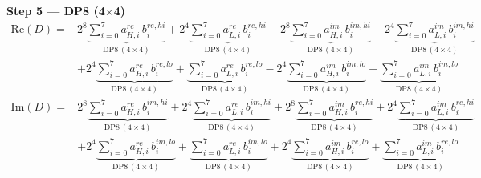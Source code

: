 \documentclass[fleqn]{article}
\newcommand{\DPop}[3]{\mathrm{DP#1}\,(#2\!\times\!#3)}
\begin{document}
\textbf{Step 5 --- DP8 (4$\times$4)}
\begin{align*}
\mathrm{Re}(D) = {}
  & 2^{8}\underbrace{\sum_{i=0}^{7} a_{H,i}^{re}\, b_i^{re,hi}}_{\DPop{8}{4}{4}}
  + 2^{4}\underbrace{\sum_{i=0}^{7} a_{L,i}^{re}\, b_i^{re,hi}}_{\DPop{8}{4}{4}}
  - 2^{8}\underbrace{\sum_{i=0}^{7} a_{H,i}^{im}\, b_i^{im,hi}}_{\DPop{8}{4}{4}}
  - 2^{4}\underbrace{\sum_{i=0}^{7} a_{L,i}^{im}\, b_i^{im,hi}}_{\DPop{8}{4}{4}} \\[0.2em]
  & + 2^{4}\underbrace{\sum_{i=0}^{7} a_{H,i}^{re}\, b_i^{re,lo}}_{\DPop{8}{4}{4}}
  + \underbrace{\sum_{i=0}^{7} a_{L,i}^{re}\, b_i^{re,lo}}_{\DPop{8}{4}{4}}
  - 2^{4}\underbrace{\sum_{i=0}^{7} a_{H,i}^{im}\, b_i^{im,lo}}_{\DPop{8}{4}{4}}
  - \underbrace{\sum_{i=0}^{7} a_{L,i}^{im}\, b_i^{im,lo}}_{\DPop{8}{4}{4}}
\end{align*}
\begin{align*}
\mathrm{Im}(D) = {}
  & 2^{8}\underbrace{\sum_{i=0}^{7} a_{H,i}^{re}\, b_i^{im,hi}}_{\DPop{8}{4}{4}}
  + 2^{4}\underbrace{\sum_{i=0}^{7} a_{L,i}^{re}\, b_i^{im,hi}}_{\DPop{8}{4}{4}}
  + 2^{8}\underbrace{\sum_{i=0}^{7} a_{H,i}^{im}\, b_i^{re,hi}}_{\DPop{8}{4}{4}}
  + 2^{4}\underbrace{\sum_{i=0}^{7} a_{L,i}^{im}\, b_i^{re,hi}}_{\DPop{8}{4}{4}} \\[0.2em]
  & + 2^{4}\underbrace{\sum_{i=0}^{7} a_{H,i}^{re}\, b_i^{im,lo}}_{\DPop{8}{4}{4}}
  + \underbrace{\sum_{i=0}^{7} a_{L,i}^{re}\, b_i^{im,lo}}_{\DPop{8}{4}{4}}
  + 2^{4}\underbrace{\sum_{i=0}^{7} a_{H,i}^{im}\, b_i^{re,lo}}_{\DPop{8}{4}{4}}
  + \underbrace{\sum_{i=0}^{7} a_{L,i}^{im}\, b_i^{re,lo}}_{\DPop{8}{4}{4}}
\end{align*}
\end{document}
